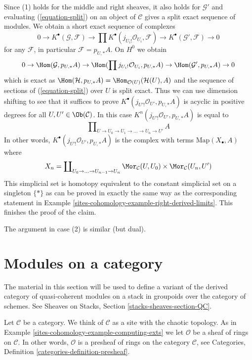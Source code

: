 \begin{example}
Since (1) holds for the middle and right sheaves, it also holds for
$\mathcal{G}'$ and evaluating (\ref{equation-split})
on an object of $\mathcal{C}$
gives a split exact sequence of modules.
We obtain a short exact sequence of complexes
$$
0 \to
K^\bullet(\mathcal{G}, \mathcal{F}) \to
\prod K^\bullet(j_{U_i!}\mathcal{O}_{U_i}, \mathcal{F}) \to
K^\bullet(\mathcal{G}', \mathcal{F}) \to 0
$$
for any $\mathcal{F}$, in particular $\mathcal{F} = p_{U, *}A$.
On $H^0$ we obtain
$$
0 \to \Hom(\mathcal{G}, p_{U, *}A) \to
\Hom(\prod j_{U_i!}\mathcal{O}_{U_i}, p_{U, *}A) \to
\Hom(\mathcal{G}', p_{U, *}A) \to 0
$$
which is exact as
$\Hom(\mathcal{H}, p_{U, *}A) = \Hom_{\mathcal{O}(U)}(\mathcal{H}(U), A)$
and the sequence of sections of (\ref{equation-split}) over $U$ is split exact.
Thus we can use dimension shifting to see that it suffices to prove
$K^\bullet(j_{U'!}\mathcal{O}_{U'}, p_{U, *}A)$ is acyclic in positive
degrees for all $U, U' \in \Ob(\mathcal{C})$. In this case
$K^n(j_{U'!}\mathcal{O}_{U'}, p_{U, *}A)$ is equal to
$$
\prod\nolimits_{U \to U_0 \to U_1 \to \ldots \to U_n \to U'} A
$$
In other words, $K^\bullet(j_{U'!}\mathcal{O}_{U'}, p_{U, *}A)$
is the complex with terms $\text{Map}(X_\bullet, A)$ where
$$
X_n = \coprod\nolimits_{U_0 \to \ldots \to U_{n - 1} \to U_n}
\Mor_\mathcal{C}(U, U_0) \times \Mor_\mathcal{C}(U_n, U')
$$
This simplicial set is homotopy equivalent to the constant simplicial
set on a singleton $\{*\}$ as can be proved in exactly the same way
as the corresponding statement in Example \ref{sites-cohomology-example-right-derived-limits}.
This finishes the proof of the claim.

\medskip\noindent
The argument in case (2) is similar (but dual).
\end{example}

\section{Modules on a category}
\label{sites-cohomology-section-modules-cohomology}
The material in this section will be used to define a variant of the
derived category of quasi-coherent modules on a stack in groupoids
over the category of schemes. See
Sheaves on Stacks, Section \ref{stacks-sheaves-section-QC}.

\medskip\noindent
Let $\mathcal{C}$ be a category. We think of $\mathcal{C}$ as a site with
the chaotic topology. As in Example \ref{sites-cohomology-example-computing-exts} we let
$\mathcal{O}$ be a sheaf of rings on $\mathcal{C}$.
In other words, $\mathcal{O}$ is
a presheaf of rings on the category $\mathcal{C}$, see
Categories, Definition \ref{categories-definition-presheaf}.


